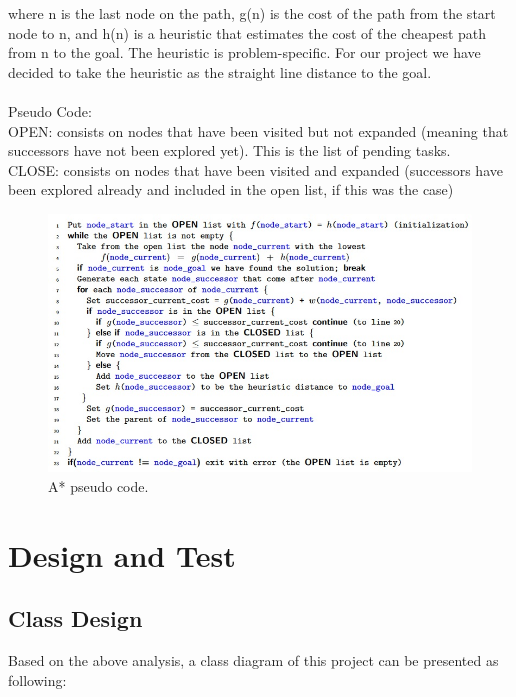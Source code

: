 \documentclass[12pt,onecolumn,titlepage]{article}
\begin{document}
\noindent where n is the last node on the path, g(n) is the cost of the path from the start node to n, and h(n) is a heuristic that estimates the cost of the cheapest path from n to the goal. The heuristic is problem-specific. For our project we have decided to take the heuristic as the straight line distance to the goal.\\
\\
\noindent Pseudo Code:\\ 
OPEN: consists on nodes that have been visited but not expanded (meaning that successors have not been explored yet). This is the list of pending tasks.\\
CLOSE: consists on nodes that have been visited and expanded (successors have been explored already and included in the open list, if this was the case)\\
\begin{figure}[H]
  \begin{center}
    \includegraphics[width=1\columnwidth]{3}
  \end{center}
  \caption{\small A* pseudo code.}
  \label{fig-label}
\end{figure} \par

\section{Design and Test}
\subsection{Class Design}
Based on the above analysis, a class diagram of this project can be presented as following:\\
\end{document}
